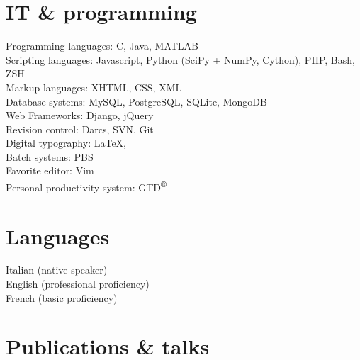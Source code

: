 \documentclass[10pt, a4paper]{article}
\begin{document}
\section*{IT \& programming}
Programming languages: C, Java, MATLAB\\
Scripting languages: Javascript, Python (SciPy + NumPy, Cython), PHP, Bash, ZSH\\
Markup languages: XHTML, CSS, XML\\
Database systems: MySQL, PostgreSQL, SQLite, MongoDB\\
Web Frameworks: Django, jQuery\\
Revision control: Darcs, SVN, Git\\
Digital typography: \LaTeX, \XeTeX\\
Batch systems: PBS\\
Favorite editor: Vim\\
Personal productivity system: GTD\textsuperscript{®}

\section*{Languages}
Italian (native speaker)\\
English (professional proficiency)\\
French (basic proficiency)

\section*{Publications \& talks}
\end{document}
